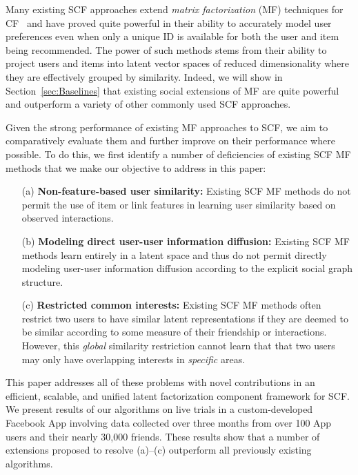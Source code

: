 \documentclass{sig-alternate}
\begin{document}
Many existing SCF approaches extend \emph{matrix factorization} (MF)
techniques for CF~\cite{pmf} and have proved quite powerful in their ability to
accurately model user preferences even when only a unique ID is
available for both the user and item being recommended.  The power of
such methods stems from their ability to project users and items into
latent vector spaces of reduced dimensionality where they are 
effectively grouped by similarity.  Indeed, we will show in
Section~\ref{sec:Baselines} that existing social extensions of MF are
quite powerful and outperform a variety of other commonly used SCF
approaches.

Given the strong performance of existing MF approaches to SCF, we aim
to comparatively evaluate them and further improve on their
performance where possible.  To do this, we first identify a number of
deficiencies of existing SCF MF methods that we make our objective to
address in this paper:
\begin{enumerate}
\item[(a)] {\bf Non-feature-based user similarity:} Existing SCF MF
methods do not permit the use of item or link features in learning
user similarity based on observed interactions.
\item[(b)] {\bf Modeling direct user-user information diffusion:}
Existing SCF MF methods learn entirely in a latent space and thus do
not permit directly modeling user-user information diffusion according
to the explicit social graph structure.
\item[(c)] {\bf Restricted common interests:} Existing SCF MF methods
often restrict two users to have similar latent representations if
they are deemed to be similar according to some measure of their
friendship or interactions.  However, this \emph{global} similarity
restriction cannot learn that that two users may only have overlapping
interests in \emph{specific} areas.
\end{enumerate}

This paper addresses all of these problems with novel contributions in
an efficient, scalable, and unified latent factorization component
framework for SCF.  We present results of our algorithms on live
trials in a custom-developed Facebook App involving data collected
over three months from over 100 App users and their nearly 30,000
friends.  These results show that a number of extensions proposed to
resolve (a)--(c) outperform all previously existing algorithms.
\end{document}

